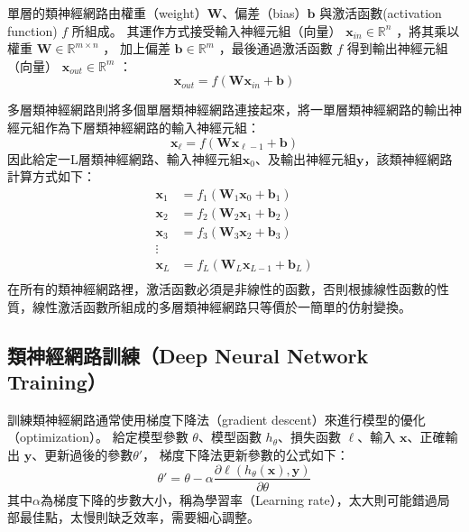 單層的類神經網路由權重（weight）$\mathbf{W}$、偏差（bias）$\mathbf{b}$ 與激活函數(activation function) $f$ 所組成。
其運作方式接受輸入神經元組（向量） $\mathbf{x}_{in} \in \mathbb{R}^{n}$ ，將其乘以權重 $\mathbf{W} \in \mathbb{R}^{m \times n}$ ，
加上偏差 $\mathbf{b} \in \mathbb{R}^{m}$ ，最後通過激活函數 $f$ 得到輸出神經元組（向量） $\mathbf{x}_{out} \in \mathbb{R}^{m}$ ：
\begin{equation}
    \mathbf{x}_{out} = f(\mathbf{W} \mathbf{x}_{in} + \mathbf{b})
\end{equation}

多層類神經網路則將多個單層類神經網路連接起來，將一單層類神經網路的輸出神經元組作為下層類神經網路的輸入神經元組：
\begin{equation}
    \mathbf{x}_{\ell} = f(\mathbf{W} \mathbf{x}_{\ell-1} + \mathbf{b})
\end{equation}
因此給定一L層類神經網路、輸入神經元組$\mathbf{x}_{0}$、及輸出神經元組$\mathbf{y}$，該類神經網路計算方式如下：
\begin{equation}
    \begin{split}
    \mathbf{x}_{1} &= f_{1}(\mathbf{W}_{1} \mathbf{x}_{0} + \mathbf{b}_{1}) \\
    \mathbf{x}_{2} &= f_{2}(\mathbf{W}_{2} \mathbf{x}_{1} + \mathbf{b}_{2}) \\
    \mathbf{x}_{3} &= f_{3}(\mathbf{W}_{3} \mathbf{x}_{2} + \mathbf{b}_{3}) \\
    \vdots \\
    \mathbf{x}_{L} &= f_{L}(\mathbf{W}_{L} \mathbf{x}_{L-1} + \mathbf{b}_{L}) \\
    \end{split}
\end{equation}
在所有的類神經網路裡，激活函數必須是非線性的函數，否則根據線性函數的性質，線性激活函數所組成的多層類神經網路只等價於一簡單的仿射變換。
\subsection{類神經網路訓練（Deep Neural Network Training）}
訓練類神經網路通常使用梯度下降法（gradient descent）來進行模型的優化（optimization）。
給定模型參數 $\theta$、模型函數 $h_{\theta}$、損失函數 $\ell$、輸入 $\mathbf{x}$、正確輸出 $\mathbf{y}$、更新過後的參數$\theta'$，
梯度下降法更新參數的公式如下：
\begin{equation}
    \theta' = \theta - \alpha \frac{\partial \ell(h_{\theta}(\mathbf{x}), \mathbf{y})}{\partial \theta}
\end{equation}
其中$\alpha$為梯度下降的步數大小，稱為學習率（Learning rate），太大則可能錯過局部最佳點，太慢則缺乏效率，需要細心調整。

